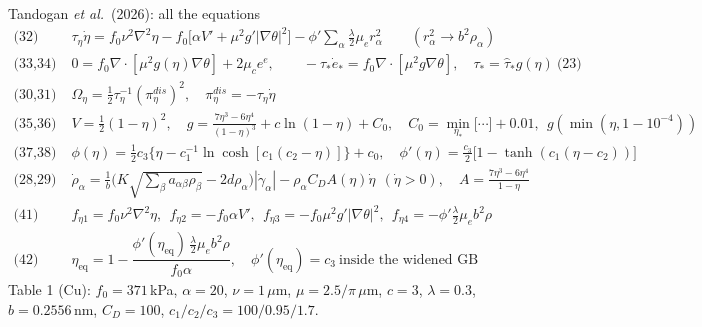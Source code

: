 \documentclass[10pt,aspectratio=169]{beamer}
\begin{document}
\begin{frame}{Tandogan \emph{et al.}~(2026): all the equations}
  \scriptsize
  \begin{align*}
    \text{(32)}\;& \tau_\eta\dot\eta = f_0\nu^2\nabla^2\eta - f_0\big[\alpha V' + \mu^2 g'|\nabla\theta|^2\big] - \phi'\textstyle\sum_\alpha\tfrac{\lambda}{2}\mu_e r_\alpha^2
      \qquad (r_\alpha^2 \to b^2\rho_\alpha) \\
    \text{(33,34)}\;& 0 = f_0\nabla\!\cdot[\mu^2 g(\eta)\nabla\theta] + 2\mu_c e^e,\qquad -\tau_*\dot e_* = f_0\nabla\!\cdot[\mu^2 g\nabla\theta],\quad \tau_* = \hat\tau_* g(\eta)\ \text{(23)} \\
    \text{(30,31)}\;& \Omega_\eta = \tfrac12\tau_\eta^{-1}(\pi^{dis}_\eta)^2,\quad \pi^{dis}_\eta = -\tau_\eta\dot\eta \\
    \text{(35,36)}\;& V = \tfrac12(1-\eta)^2,\quad g = \tfrac{7\eta^3 - 6\eta^4}{(1-\eta)^3} + c\ln(1-\eta) + C_0,\quad
      C_0 = \min_{\eta_*}\big[\cdots\big] + 0.01,\ \ g(\min(\eta,1-10^{-4})) \\
    \text{(37,38)}\;& \phi(\eta) = \tfrac12 c_3\big\{\eta - c_1^{-1}\ln\cosh[c_1(c_2-\eta)]\big\} + c_0,\quad
      \phi'(\eta) = \tfrac{c_3}{2}\big[1 - \tanh(c_1(\eta - c_2))\big] \\
    \text{(28,29)}\;& \dot\rho_\alpha = \tfrac1b\big(K\sqrt{\textstyle\sum_\beta a_{\alpha\beta}\rho_\beta} - 2d\rho_\alpha\big)|\dot\gamma_\alpha| - \rho_\alpha C_D A(\eta)\dot\eta\ \ (\dot\eta > 0),\quad
      A = \tfrac{7\eta^3 - 6\eta^4}{1-\eta} \\
    \text{(41)}\;& f_{\eta1} = f_0\nu^2\nabla^2\eta,\ \ f_{\eta2} = -f_0\alpha V',\ \ f_{\eta3} = -f_0\mu^2 g'|\nabla\theta|^2,\ \ f_{\eta4} = -\phi'\tfrac{\lambda}{2}\mu_e b^2\rho \\
    \text{(42)}\;& \eta_{\text{eq}} = 1 - \dfrac{\phi'(\eta_{\text{eq}})\,\tfrac{\lambda}{2}\mu_e b^2\rho}{f_0\alpha},\quad \phi'(\eta_{\text{eq}}) = c_3\ \text{inside the widened GB}
  \end{align*}
  Table 1 (Cu): $f_0 = 371$\,kPa, $\alpha = 20$, $\nu = 1\,\mu$m, $\mu = 2.5/\pi\,\mu$m, $c = 3$, $\lambda = 0.3$,
  $b = 0.2556$\,nm, $C_D = 100$, $c_1/c_2/c_3 = 100/0.95/1.7$.
\end{frame}
\end{document}
